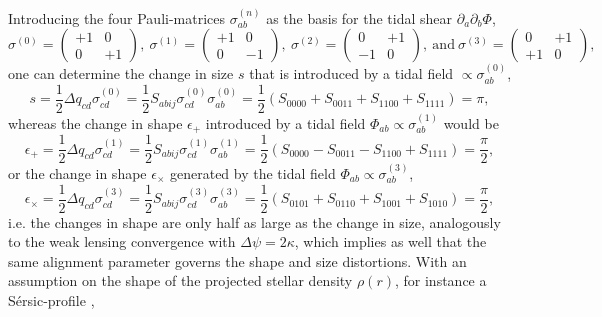 \documentclass[a4paper,fleqn,usenatbib]{mnras}
\begin{document}
Introducing the four Pauli-matrices $\sigma^{(n)}_{ab}$ as the basis for the tidal shear $\partial_a\partial_b\Phi$,
\begin{equation}
\sigma^{(0)} = \left(
\begin{array}{cc}
+1 & 0 \\ 0 & +1
\end{array}
\right),~
\sigma^{(1)} = \left(
\begin{array}{cc}
+1 & 0 \\ 0 & -1
\end{array}
\right),~
\sigma^{(2)} = \left(
\begin{array}{cc}
0 & +1 \\ -1 & 0
\end{array}
\right),
\mathrm{~and~}
\sigma^{(3)} = \left(
\begin{array}{cc}
0 & +1 \\ +1 & 0
\end{array}
\right),
\end{equation}
one can determine the change in size $s$ that is introduced by a tidal field $\propto\sigma_{ab}^{(0)}$,
\begin{equation}
s = 
\frac{1}{2}\Delta q_{cd}\sigma^{(0)}_{cd} = 
\frac{1}{2}S_{abij}\sigma^{(0)}_{cd}\sigma^{(0)}_{ab} = 
\frac{1}{2}\left(S_{0000} + S_{0011} + S_{1100} + S_{1111}\right) = 
\pi,
\end{equation}
whereas the change in shape $\epsilon_+$ introduced by a tidal field $\Phi_{ab}\propto\sigma^{(1)}_{ab}$ would be
\begin{equation}
\epsilon_+ = 
\frac{1}{2}\Delta q_{cd}\sigma^{(1)}_{cd} = 
\frac{1}{2}S_{abij}\sigma^{(1)}_{cd}\sigma^{(1)}_{ab} = 
\frac{1}{2}\left(S_{0000} - S_{0011} - S_{1100} + S_{1111}\right) =
\frac{\pi}{2},
\end{equation}
or the change in shape $\epsilon_\times$ generated by the tidal field $\Phi_{ab}\propto\sigma^{(3)}_{ab}$,
\begin{equation}
\epsilon_\times = 
\frac{1}{2}\Delta q_{cd}\sigma^{(3)}_{cd} =
\frac{1}{2}S_{abij}\sigma^{(3)}_{cd}\sigma^{(3)}_{ab} = 
\frac{1}{2}\left(S_{0101} + S_{0110} + S_{1001} + S_{1010}\right) = 
\frac{\pi}{2},
\end{equation}
i.e. the changes in shape are only half as large as the change in size, analogously to the weak lensing convergence with $\Delta\psi = 2\kappa$, which implies as well that the same alignment parameter governs the shape and size distortions. With an assumption on the shape of the projected stellar density $\rho(r)$, for instance a S{\'e}rsic-profile \citep{sersic_influence_1963, graham_concise_2005},
\end{document}
